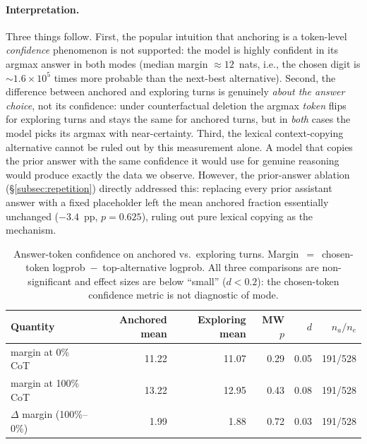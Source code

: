 \documentclass{article}
\begin{document}
\paragraph{Interpretation.}
Three things follow.
First, the popular intuition that anchoring is a token-level
\emph{confidence} phenomenon is not supported: the model is highly
confident in its argmax answer in both modes (median margin
$\approx 12$~nats, i.e., the chosen digit is $\sim 1.6{\times}10^{5}$
times more probable than the next-best alternative).
Second, the difference between anchored and exploring turns is
genuinely \emph{about the answer choice}, not its confidence:
under counterfactual deletion the argmax \emph{token} flips for
exploring turns and stays the same for anchored turns, but in
\emph{both} cases the model picks its argmax with near-certainty.
Third, the lexical context-copying alternative cannot be ruled out
by this measurement alone.
A model that copies the prior answer with the same confidence it
would use for genuine reasoning would produce exactly the data we
observe.
However, the prior-answer ablation (\S\ref{subsec:repetition})
directly addressed this: replacing every prior assistant answer
with a fixed placeholder left the mean anchored fraction essentially
unchanged ($-3.4$~pp, $p=0.625$), ruling out pure lexical copying
as the mechanism.

\begin{table}[htbp]
\caption{%
  Answer-token confidence on anchored vs.\ exploring turns.
  Margin~$=$~chosen-token logprob~$-$~top-alternative logprob.
  All three comparisons are non-significant and effect sizes are
  below ``small'' ($d < 0.2$): the chosen-token confidence
  metric is not diagnostic of mode.%
}
\label{tab:logprob}
\centering
\setlength{\tabcolsep}{6pt}
\begin{tabular}{lrrrrr}
\toprule
Quantity                       & Anchored mean & Exploring mean & MW $p$ & $d$  & $n_a/n_e$ \\
\midrule
margin at 0\% CoT              & 11.22 & 11.07 & 0.29 & 0.05 & 191/528 \\
margin at 100\% CoT            & 13.22 & 12.95 & 0.43 & 0.08 & 191/528 \\
$\Delta$ margin (100\%--0\%)   &  1.99 &  1.88 & 0.72 & 0.03 & 191/528 \\
\bottomrule
\end{tabular}
\end{table}
\end{document}
